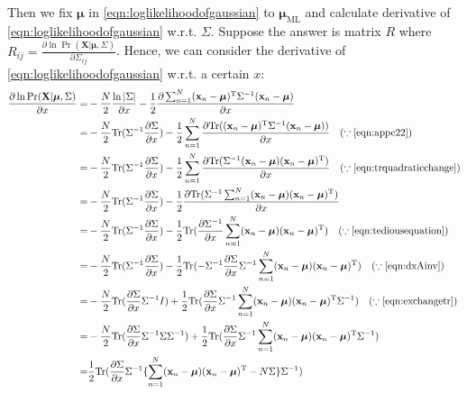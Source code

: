 Then we fix $\boldsymbol{\mu}$ in \eqref{eqn:loglikelihoodofgaussian}
to $\boldsymbol{\mu}_{\text{ML}}$ and calculate derivative of
\eqref{eqn:loglikelihoodofgaussian} w.r.t. $\Sigma$. Suppose the answer
is matrix $R$ where
$R_{ij}=\frac{\partial{}\ln\Pr(\mathbf{X}\vert\boldsymbol{\mu},\Sigma)}{\partial{}\Sigma_{ij}}$.
Hence, we can consider the derivative of
\eqref{eqn:loglikelihoodofgaussian} w.r.t. a certain $x$:
\begin{equation}
\begin{split}
\frac{\partial{}\ln\Pr(\mathbf{X}\vert\boldsymbol{\mu},\Sigma)}{\partial{}x}=&-\frac{N}{2}\frac{\ln\vert\Sigma\vert}{\partial{}x}-\frac{1}{2}\frac{\partial{}\sum_{n=1}^{N}(\mathbf{x}_{n}-\boldsymbol{\mu})^{\mathrm{T}}\Sigma^{-1}(\mathbf{x}_{n}-\boldsymbol{\mu})}{\partial{}x}\\
=&-\frac{N}{2}\text{Tr}(\Sigma^{-1}\frac{\partial{}\Sigma}{\partial{}x})-\frac{1}{2}\sum_{n=1}^{N}\frac{\partial{}\text{Tr}((\mathbf{x}_{n}-\boldsymbol{\mu})^{\mathrm{T}}\Sigma^{-1}(\mathbf{x}_{n}-\boldsymbol{\mu}))}{\partial{}x}\quad{}(\because{}\text{\eqref{eqn:appc22}})\\
=&-\frac{N}{2}\text{Tr}(\Sigma^{-1}\frac{\partial{}\Sigma}{\partial{}x})-\frac{1}{2}\sum_{n=1}^{N}\frac{\partial{}\text{Tr}(\Sigma^{-1}(\mathbf{x}_{n}-\boldsymbol{\mu})(\mathbf{x}_{n}-\boldsymbol{\mu})^{\mathrm{T}})}{\partial{}x}\quad{}(\because{}\text{\eqref{eqn:trquadraticchange}})\\
=&-\frac{N}{2}\text{Tr}(\Sigma^{-1}\frac{\partial{}\Sigma}{\partial{}x})-\frac{1}{2}\frac{\partial{}\text{Tr}(\Sigma^{-1}\sum_{n=1}^{N}(\mathbf{x}_{n}-\boldsymbol{\mu})(\mathbf{x}_{n}-\boldsymbol{\mu})^{\mathrm{T}})}{\partial{}x}\\
=&-\frac{N}{2}\text{Tr}(\Sigma^{-1}\frac{\partial{}\Sigma}{\partial{}x})-\frac{1}{2}\text{Tr}(\frac{\partial{}\Sigma^{-1}}{\partial{}x}\sum_{n=1}^{N}(\mathbf{x}_{n}-\boldsymbol{\mu})(\mathbf{x}_{n}-\boldsymbol{\mu})^{\mathrm{T}})\quad{}(\because{}\text{\eqref{eqn:tediousequation}})\\
=&-\frac{N}{2}\text{Tr}(\Sigma^{-1}\frac{\partial{}\Sigma}{\partial{}x})-\frac{1}{2}\text{Tr}(-\Sigma^{-1}\frac{\partial\Sigma}{\partial{}x}\Sigma^{-1}\sum_{n=1}^{N}(\mathbf{x}_{n}-\boldsymbol{\mu})(\mathbf{x}_{n}-\boldsymbol{\mu})^{\mathrm{T}})\quad{}(\because{}\text{\eqref{eqn:dxAinv}})\\
=&-\frac{N}{2}\text{Tr}(\frac{\partial{}\Sigma{}}{\partial{}x}\Sigma^{-1}I)+\frac{1}{2}\text{Tr}(\frac{\partial\Sigma}{\partial{}x}\Sigma^{-1}\sum_{n=1}^{N}(\mathbf{x}_{n}-\boldsymbol{\mu})(\mathbf{x}_{n}-\boldsymbol{\mu})^{\mathrm{T}}\Sigma^{-1})\quad{}(\because{}\text{\eqref{eqn:exchangetr}})\\
=&-\frac{N}{2}\text{Tr}(\frac{\partial{}\Sigma}{\partial{}x}\Sigma^{-1}\Sigma\Sigma^{-1})+\frac{1}{2}\text{Tr}(\frac{\partial\Sigma}{\partial{}x}\Sigma^{-1}\sum_{n=1}^{N}(\mathbf{x}_{n}-\boldsymbol{\mu})(\mathbf{x}_{n}-\boldsymbol{\mu})^{\mathrm{T}}\Sigma^{-1})\\
=&\frac{1}{2}\text{Tr}(\frac{\partial{}\Sigma}{\partial{}x}\Sigma^{-1}\{\sum_{n=1}^{N}(\mathbf{x}_{n}-\boldsymbol{\mu})(\mathbf{x}_{n}-\boldsymbol{\mu})^{\mathrm{T}}-N\Sigma\}\Sigma^{-1})
\end{split}
\end{equation}
